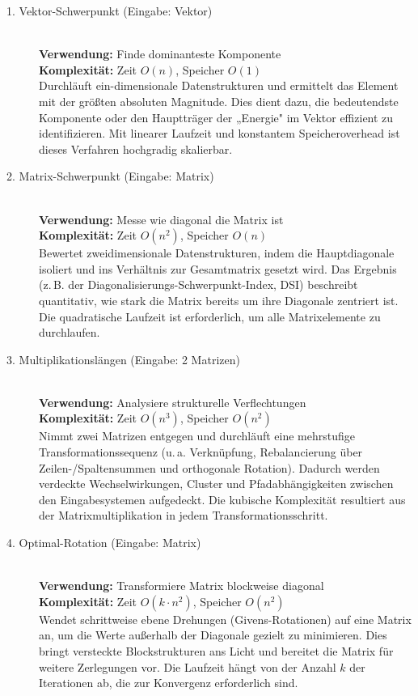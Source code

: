 \documentclass[a4paper,12pt]{article}
\begin{document}
\begin{description}
     \item[1. Vektor-Schwerpunkt (Eingabe: Vektor)] \hfill \\
    \textbf{Verwendung:} Finde dominanteste Komponente \\
    \textbf{Komplexität:} Zeit $O(n)$, Speicher $O(1)$ \\
    Durchläuft ein-dimensionale Datenstrukturen und ermittelt das Element mit der größten absoluten Magnitude. Dies dient dazu, die bedeutendste Komponente oder den Hauptträger der „Energie" im Vektor effizient zu identifizieren. Mit linearer Laufzeit und konstantem Speicheroverhead ist dieses Verfahren hochgradig skalierbar.

    \item[2. Matrix-Schwerpunkt (Eingabe: Matrix)] \hfill \\
    \textbf{Verwendung:} Messe wie diagonal die Matrix ist \\
    \textbf{Komplexität:} Zeit $O(n^2)$, Speicher $O(n)$ \\
    Bewertet zweidimensionale Datenstrukturen, indem die Hauptdiagonale isoliert und ins Verhältnis zur Gesamtmatrix gesetzt wird. Das Ergebnis (z.\,B. der Diagonalisierungs-Schwerpunkt-Index, DSI) beschreibt quantitativ, wie stark die Matrix bereits um ihre Diagonale zentriert ist. Die quadratische Laufzeit ist erforderlich, um alle Matrixelemente zu durchlaufen.

    \item[3. Multiplikationslängen (Eingabe: 2 Matrizen)] \hfill \\
    \textbf{Verwendung:} Analysiere strukturelle Verflechtungen \\
    \textbf{Komplexität:} Zeit $O(n^3)$, Speicher $O(n^2)$ \\
    Nimmt zwei Matrizen entgegen und durchläuft eine mehrstufige Transformationssequenz (u.\,a. Verknüpfung, Rebalancierung über Zeilen-/Spaltensummen und orthogonale Rotation). Dadurch werden verdeckte Wechselwirkungen, Cluster und Pfadabhängigkeiten zwischen den Eingabesystemen aufgedeckt. Die kubische Komplexität resultiert aus der Matrixmultiplikation in jedem Transformationsschritt.

    \item[4. Optimal-Rotation (Eingabe: Matrix)] \hfill \\
    \textbf{Verwendung:} Transformiere Matrix blockweise diagonal \\
    \textbf{Komplexität:} Zeit $O(k \cdot n^2)$, Speicher $O(n^2)$ \\
    Wendet schrittweise ebene Drehungen (Givens-Rotationen) auf eine Matrix an, um die Werte außerhalb der Diagonale gezielt zu minimieren. Dies bringt versteckte Blockstrukturen ans Licht und bereitet die Matrix für weitere Zerlegungen vor. Die Laufzeit hängt von der Anzahl $k$ der Iterationen ab, die zur Konvergenz erforderlich sind.


\end{description}
\end{document}
